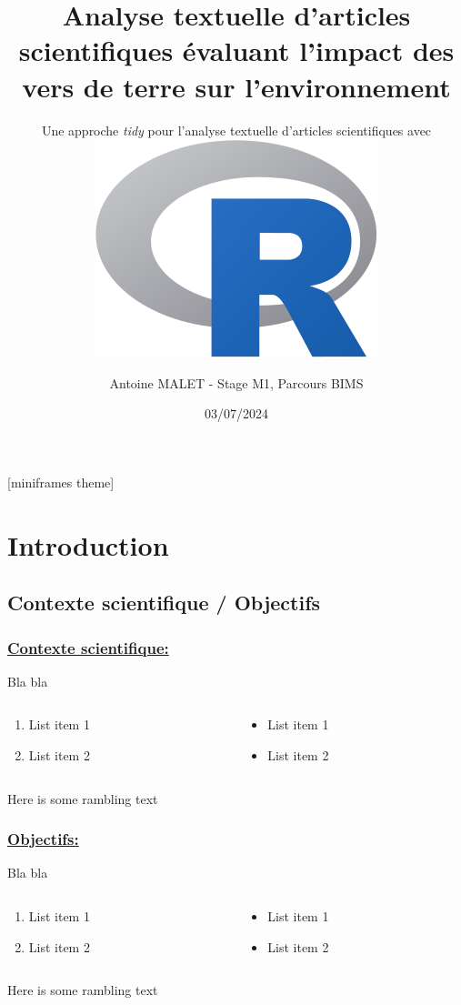 \documentclass[xcolor=dvipsnames]{beamer}
\title[Analyse d'articles scientifiques avec R]{Analyse textuelle d’articles scientifiques évaluant l’impact des vers de terre sur l’environnement}
\subtitle{Une approche \textit{tidy} pour l'analyse textuelle d'articles scientifiques avec \includegraphics[scale=0.04]{R_logo.svg.png}}
\author[Stage M1 BIMS]{Antoine MALET - Stage M1, Parcours BIMS}
\institute[UMR MIA Paris-Saclay]{Campus Agro Paris-Saclay - Unité Mathématiques et Informatique Appliqués}
\date{03/07/2024}
\begin{document}

	\begin{frame}
		\titlepage
	\end{frame}
	
[miniframes theme]

	\section*{Introduction}
	\subsection*{Contexte scientifique / Objectifs} %

	\begin{frame}
		\frametitle{\underline{Contexte scientifique:}}
		Bla bla 
		\begin{columns}
			\begin{column}{0.5\textwidth} %
				\begin{enumerate}
					\item List item 1
					\item List item 2
				\end{enumerate}
			\end{column}
			\begin{column}{0.5\textwidth}
				\begin{itemize}
					\item List item 1
					\item List item 2
				\end{itemize}
			\end{column}
		\end{columns}
		\vspace{\baselineskip}
		Here is some rambling text
	\end{frame}

	\begin{frame}
		\frametitle{\underline{Objectifs:}}
		Bla bla 
		\begin{columns}
			\begin{column}{0.5\textwidth} %
				\begin{enumerate}
					\item List item 1
					\item List item 2
				\end{enumerate}
			\end{column}
			\begin{column}{0.5\textwidth}
				\begin{itemize}
					\item List item 1
					\item List item 2
				\end{itemize}
			\end{column}
		\end{columns}
		\vspace{\baselineskip}
		Here is some rambling text
	\end{frame}
\end{document}
